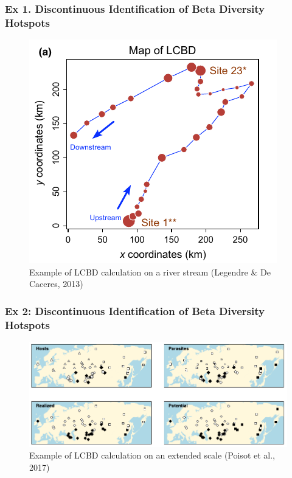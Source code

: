 \documentclass[10pt]{beamer}
\begin{document}
\begin{frame}
  \frametitle{Ex 1. Discontinuous Identification of Beta Diversity Hotspots}
  \begin{figure}
    \centering
    \hspace*{-0cm}\includegraphics[scale=0.5]{fig/lcbd_LegeDeCa2013.png}
    \caption{Example of LCBD calculation on a river stream (Legendre \& De Caceres, 2013)}
  \end{figure}
\end{frame}

\begin{frame}
  \frametitle{Ex 2: Discontinuous Identification of Beta Diversity Hotspots}
  \begin{figure}
    \centering
    \hspace*{-0cm}\includegraphics[scale=0.35]{fig/lcbd_Pois2017.png}
    \caption{Example of LCBD calculation on an extended scale (Poisot et al., 2017)}
  \end{figure}
\end{frame}
\end{document}
